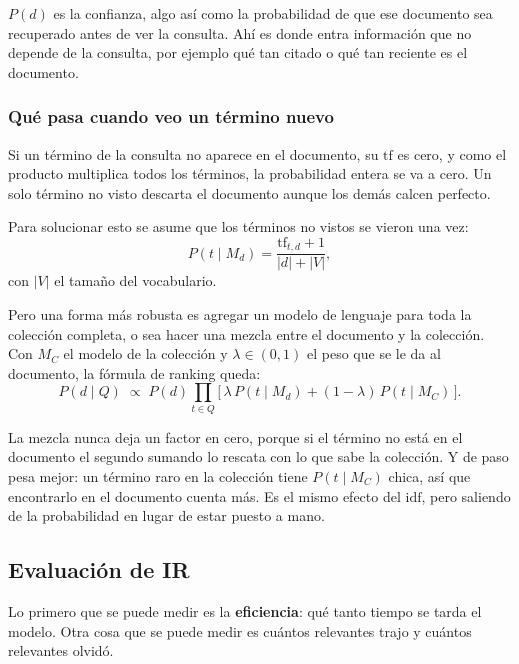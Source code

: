 \documentclass[11pt,letterpaper]{article}
\begin{document}
$P(d)$ es la confianza, algo así como la probabilidad de que ese
documento sea recuperado antes de ver la consulta. Ahí es donde entra
información que no depende de la consulta, por ejemplo qué tan citado
o qué tan reciente es el documento.

\subsubsection*{Qué pasa cuando veo un término nuevo}

Si un término de la consulta no aparece en el documento, su
$\mathrm{tf}$ es cero, y como el producto multiplica todos los
términos, la probabilidad entera se va a cero. Un solo término no
visto descarta el documento aunque los demás calcen perfecto.

Para solucionar esto se asume que los términos no vistos se vieron una
vez:
\[
    P(t \mid M_d) = \frac{\mathrm{tf}_{t,d} + 1}{|d| + |V|} ,
\]
con $|V|$ el tamaño del vocabulario.

Pero una forma más robusta es agregar un modelo de lenguaje para toda
la colección completa, o sea hacer una mezcla entre el documento y la
colección. Con $M_C$ el modelo de la colección y
$\lambda \in (0,1)$ el peso que se le da al documento, la fórmula de
ranking queda:
\[
    P(d \mid Q) \;\propto\; P(d) \prod_{t \in Q}
    \Big[\, \lambda\, P(t \mid M_d)
    + (1 - \lambda)\, P(t \mid M_C) \,\Big] .
\]

\begin{idea}
    La mezcla nunca deja un factor en cero, porque si el término no
    está en el documento el segundo sumando lo rescata con lo que sabe
    la colección. Y de paso pesa mejor: un término raro en la
    colección tiene $P(t \mid M_C)$ chica, así que encontrarlo en el
    documento cuenta más. Es el mismo efecto del $\mathrm{idf}$, pero
    saliendo de la probabilidad en lugar de estar puesto a mano.
\end{idea}


\subsection*{Evaluación de IR}

Lo primero que se puede medir es la \textbf{eficiencia}: qué tanto
tiempo se tarda el modelo. Otra cosa que se puede medir es cuántos
relevantes trajo y cuántos relevantes olvidó.
\end{document}
